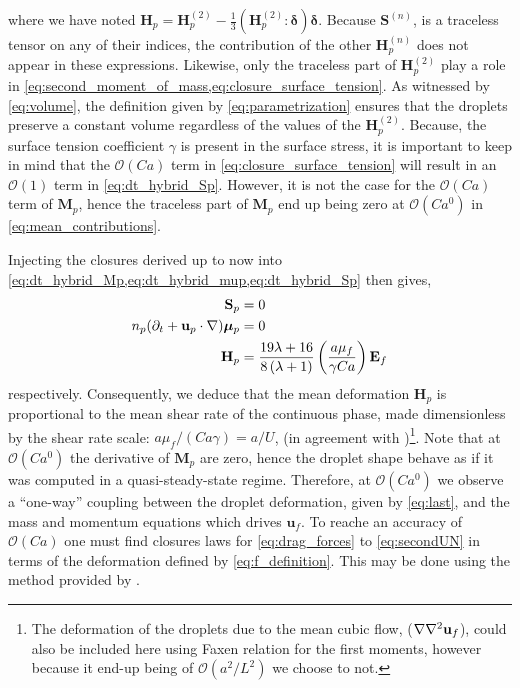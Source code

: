 where we have noted $\textbf{H}_p = \textbf{H}_p^{(2)}-\frac{1}{3}(\textbf{H}_p^{(2)}: \bm\delta)\bm\delta$.   
Because $\textbf{S}^{(n)}$, is a traceless tensor on any of their indices, the contribution of the other $\textbf{H}_p^{(n)}$ does not appear in these expressions. 
Likewise, only the traceless part of $\textbf{H}_p^{(2)}$ play a role in \ref{eq:second_moment_of_mass,eq:closure_surface_tension}. 
As witnessed by \ref{eq:volume}, the definition given by \ref{eq:parametrization} ensures that the droplets preserve a constant volume regardless of the values of the $\textbf{H}_p^{(2)}$. 
Because, the surface tension coefficient $\gamma$ is present in the surface stress, it is important to keep in mind that the $\mathcal{O}(Ca)$ term in \ref{eq:closure_surface_tension} will result in an $\mathcal{O}(1)$ term in \ref{eq:dt_hybrid_Sp}. 
However, it is not the case for the $\mathcal{O}(Ca)$ term of $\textbf{M}_p$, hence the traceless part of $\textbf{M}_p$ end up being zero at $\mathcal{O}(Ca^0)$ in \ref{eq:mean_contributions}.  

Injecting the closures derived up to now into \ref{eq:dt_hybrid_Mp,eq:dt_hybrid_mup,eq:dt_hybrid_Sp} then gives,
\begin{align}    
\textbf{S}_p &= 0\\
    n_p (\partial_t + \textbf{u}_p \cdot \mathbf{\nabla})\bm\mu_p &= 0\\
    \textbf{H}_p
    &=
    \frac{19 \lambda + 16}{8 \left(\lambda + 1\right)}
    \left(\frac{a \mu_f}{\gamma Ca}\right)
    \textbf{E}_f
\end{align}
respectively. 
Consequently, we deduce that the mean deformation $\textbf{H}_p$ is proportional to the mean shear rate of the continuous phase, made dimensionless by the shear rate scale: $a \mu_f /(Ca \gamma)= a/U$, (in agreement with \citet{leal2007advanced})\footnote{The deformation of the droplets due to the mean cubic flow, ($\mathbf{\nabla}\mathbf{\nabla}^2\textbf{u}_f$), could also be included here using Faxen relation for the first moments, however because it end-up being of $\mathcal{O}(a^2/L^2)$ we choose to not. }.  
Note that at $\mathcal{O}(Ca^0)$ the derivative of $\textbf{M}_p$ are zero, hence the droplet shape behave as if it was computed in a quasi-steady-state regime.
Therefore, at $\mathcal{O}(Ca^0)$ we observe a ``one-way'' coupling between the droplet deformation, given by \ref{eq:last}, and the mass and momentum equations which drives $\textbf{u}_f$. 
To reache an accuracy of $\mathcal{O}(Ca)$ one must find closures laws for \ref{eq:drag_forces} to \ref{eq:secondUN} in terms of the deformation defined by \ref{eq:f_definition}. 
This may be done using the method provided by \cite{brenner1963stokes}. 

